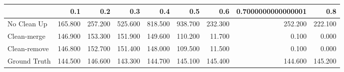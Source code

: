 \begin{tabular}{lrrrrrrrr}
\toprule
{} &     0.1 &     0.2 &     0.3 &     0.4 &     0.5 &     0.6 & 0.7000000000000001 &     0.8 \\
\midrule
No Clean Up  & 165.800 & 257.200 & 525.600 & 818.500 & 938.700 & 232.300 &            252.200 & 222.100 \\
Clean-merge  & 146.900 & 153.300 & 151.900 & 149.600 & 110.200 &  11.700 &              0.100 &   0.000 \\
Clean-remove & 146.800 & 152.700 & 151.400 & 148.000 & 109.500 &  11.500 &              0.100 &   0.000 \\
Ground Truth & 144.500 & 146.600 & 143.300 & 144.700 & 145.100 & 145.400 &            144.600 & 145.200 \\
\bottomrule
\end{tabular}

